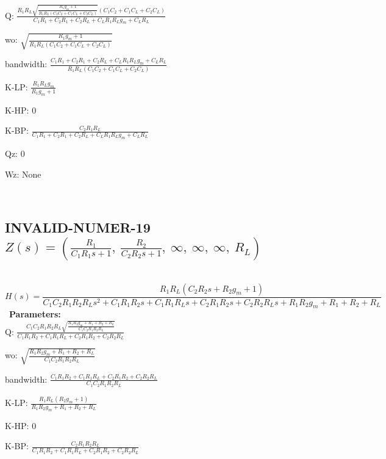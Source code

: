 \documentclass{article}
\begin{document}
Q: $\frac{R_{1} R_{L} \sqrt{\frac{R_{1} g_{m} + 1}{R_{1} R_{L} \left(C_{1} C_{2} + C_{1} C_{L} + C_{2} C_{L}\right)}} \left(C_{1} C_{2} + C_{1} C_{L} + C_{2} C_{L}\right)}{C_{1} R_{1} + C_{2} R_{1} + C_{2} R_{L} + C_{L} R_{1} R_{L} g_{m} + C_{L} R_{L}}$\ 

wo: $\sqrt{\frac{R_{1} g_{m} + 1}{R_{1} R_{L} \left(C_{1} C_{2} + C_{1} C_{L} + C_{2} C_{L}\right)}}$\ 

bandwidth: $\frac{C_{1} R_{1} + C_{2} R_{1} + C_{2} R_{L} + C_{L} R_{1} R_{L} g_{m} + C_{L} R_{L}}{R_{1} R_{L} \left(C_{1} C_{2} + C_{1} C_{L} + C_{2} C_{L}\right)}$\ 

K-LP: $\frac{R_{1} R_{L} g_{m}}{R_{1} g_{m} + 1}$\ 

K-HP: $0$\ 

K-BP: $\frac{C_{2} R_{1} R_{L}}{C_{1} R_{1} + C_{2} R_{1} + C_{2} R_{L} + C_{L} R_{1} R_{L} g_{m} + C_{L} R_{L}}$\ 

Qz: $0$\ 

Wz: $\text{None}$\ 

\ 

\subsection{INVALID-NUMER-19 $Z(s) = \left( \frac{R_{1}}{C_{1} R_{1} s + 1}, \  \frac{R_{2}}{C_{2} R_{2} s + 1}, \  \infty, \  \infty, \  \infty, \  R_{L}\right)$ } \ 
\textbf{\[H(s) = \frac{R_{1} R_{L} \left(C_{2} R_{2} s + R_{2} g_{m} + 1\right)}{C_{1} C_{2} R_{1} R_{2} R_{L} s^{2} + C_{1} R_{1} R_{2} s + C_{1} R_{1} R_{L} s + C_{2} R_{1} R_{2} s + C_{2} R_{2} R_{L} s + R_{1} R_{2} g_{m} + R_{1} + R_{2} + R_{L}}\] } \ 
\textbf{Parameters:}\\ 

Q: $\frac{C_{1} C_{2} R_{1} R_{2} R_{L} \sqrt{\frac{R_{1} R_{2} g_{m} + R_{1} + R_{2} + R_{L}}{C_{1} C_{2} R_{1} R_{2} R_{L}}}}{C_{1} R_{1} R_{2} + C_{1} R_{1} R_{L} + C_{2} R_{1} R_{2} + C_{2} R_{2} R_{L}}$\ 

wo: $\sqrt{\frac{R_{1} R_{2} g_{m} + R_{1} + R_{2} + R_{L}}{C_{1} C_{2} R_{1} R_{2} R_{L}}}$\ 

bandwidth: $\frac{C_{1} R_{1} R_{2} + C_{1} R_{1} R_{L} + C_{2} R_{1} R_{2} + C_{2} R_{2} R_{L}}{C_{1} C_{2} R_{1} R_{2} R_{L}}$\ 

K-LP: $\frac{R_{1} R_{L} \left(R_{2} g_{m} + 1\right)}{R_{1} R_{2} g_{m} + R_{1} + R_{2} + R_{L}}$\ 

K-HP: $0$\ 

K-BP: $\frac{C_{2} R_{1} R_{2} R_{L}}{C_{1} R_{1} R_{2} + C_{1} R_{1} R_{L} + C_{2} R_{1} R_{2} + C_{2} R_{2} R_{L}}$\ 
\end{document}
